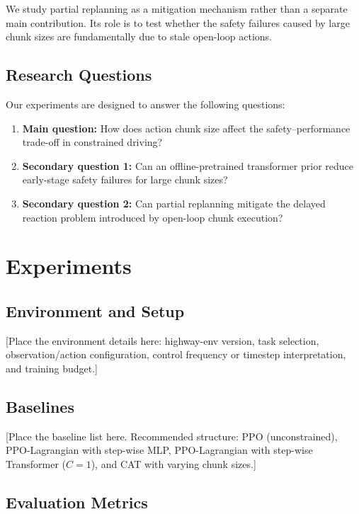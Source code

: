 \documentclass{article}
\begin{document}
We study partial replanning as a mitigation mechanism rather than a separate main contribution. Its role is to test whether the safety failures caused by large chunk sizes are fundamentally due to stale open-loop actions.

\subsection{Research Questions}

Our experiments are designed to answer the following questions:

\begin{enumerate}
    \item \textbf{Main question:} How does action chunk size affect the safety--performance trade-off in constrained driving?
    \item \textbf{Secondary question 1:} Can an offline-pretrained transformer prior reduce early-stage safety failures for large chunk sizes?
    \item \textbf{Secondary question 2:} Can partial replanning mitigate the delayed reaction problem introduced by open-loop chunk execution?
\end{enumerate}

\section{Experiments}

\subsection{Environment and Setup}

[Place the environment details here: highway-env version, task selection, observation/action configuration, control frequency or timestep interpretation, and training budget.]

\subsection{Baselines}

[Place the baseline list here. Recommended structure: PPO (unconstrained), PPO-Lagrangian with step-wise MLP, PPO-Lagrangian with step-wise Transformer ($C=1$), and CAT with varying chunk sizes.]

\subsection{Evaluation Metrics}
\end{document}
